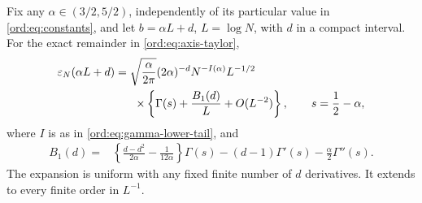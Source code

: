 \begin{lemma}\label{ord:lem:threshold}
Fix any $\alpha\in(3/2,5/2)$, independently of its particular value in
\eqref{ord:eq:constants}, and let $b=\alpha L+d$, $L=\log N$, with $d$
in a compact interval. For the exact remainder in
\eqref{ord:eq:axis-taylor},
\begin{equation}\label{ord:eq:threshold-expansion}
 \begin{split}
 \varepsilon_N(\alpha L+d)
 ={}&\sqrt{\frac\alpha{2\pi}}(2\alpha)^{-d}
      N^{-I(\alpha)}L^{-1/2}\\
 &\mathrel{}\times\left\{\Gamma(s)+\frac{B_1(d)}L+O(L^{-2})\right\},
 \qquad s=\frac12-\alpha,
 \end{split}
\end{equation}
where $I$ is as in \eqref{ord:eq:gamma-lower-tail}, and
\begin{equation}\label{ord:eq:B1}
 \begin{split}
 B_1(d)={}&\left\{\frac{d-d^2}{2\alpha}-\frac1{12\alpha}\right\}\Gamma(s)
 -(d-1)\Gamma'(s)-\frac\alpha2\Gamma''(s).
 \end{split}
\end{equation}
The expansion is uniform with any fixed finite number of $d$ derivatives.
It extends to every finite order in $L^{-1}$.
\end{lemma}
